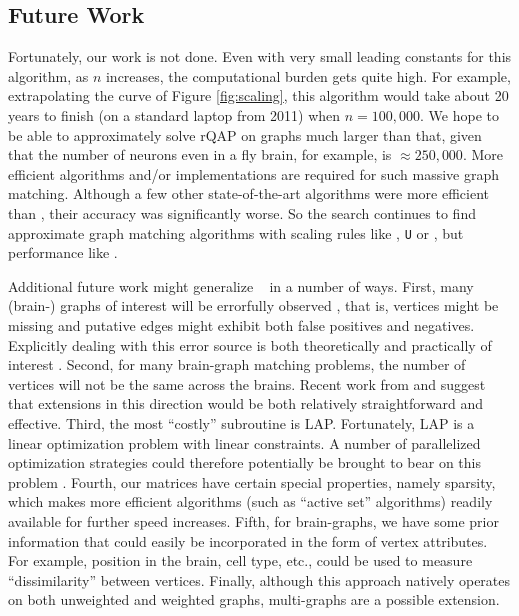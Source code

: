 \documentclass[preprint,11pt]{elsarticle}
\begin{document}
\subsection{Future Work}

Fortunately, our work is not done. Even with very small leading constants for this algorithm, as $n$ increases, the computational burden gets quite high.  For example, extrapolating the curve of Figure \ref{fig:scaling}, this algorithm would take about 20 years to finish (on a standard laptop from 2011) when $n=100,000$.  We hope to be able to approximately solve rQAP on graphs much larger than that, given that the number of neurons even in a fly brain, for example, is $\approx 250,000$.  More efficient algorithms and/or implementations are required for such massive graph matching. Although a few other state-of-the-art algorithms were more efficient than \FAQ, their accuracy was significantly worse.  So the search continues to find approximate graph matching algorithms with scaling rules like \Qcv, \texttt{U} or \Rank, but performance like \FAQ.


Additional future work might generalize \FAQ~ in a number of ways.  First, many (brain-) graphs of interest will be errorfully observed \cite{Priebe2011}, that is, vertices might be missing and putative edges might exhibit both false positives and negatives.  Explicitly dealing with this error source is both theoretically and practically of interest \cite{VP11_unlabeled}.  
Second, for many brain-graph matching problems, the number of vertices will not be the same across the brains.  Recent work from \cite{Zaslavskiy2009, Zaslavskiy2010} and \cite{Escolano2011} suggest that extensions in this direction would be both relatively straightforward and effective. Third, the most ``costly'' subroutine is LAP.  Fortunately, LAP is a linear optimization problem with linear constraints.  A number of parallelized optimization strategies could therefore potentially be brought to bear on this problem \cite{Boyd2011}.  Fourth, our matrices have certain special properties, namely sparsity, which makes more efficient algorithms (such as ``active set'' algorithms) readily available for further speed increases.  Fifth, for brain-graphs, we have some prior information that could easily be incorporated in the form of vertex attributes.  For example, position in the brain, cell type, etc., could be used to measure ``dissimilarity'' between vertices.  %
Finally, although this approach natively operates on both unweighted and weighted graphs, multi-graphs are a possible extension.
\end{document}
